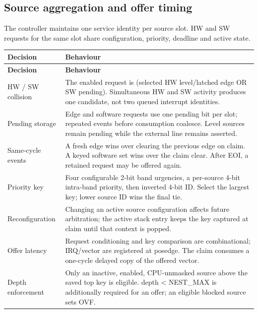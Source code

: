 \documentclass[11pt]{article}
\begin{document}
\subsection{Source aggregation and offer timing}
\noindent The controller maintains one service identity per source slot. HW and SW requests for the same slot share configuration, priority, deadline and active state.\par\medskip
{\small
\begin{longtable}{@{}L{0.2500\dimexpr\linewidth-12pt\relax}L{0.7500\dimexpr\linewidth-12pt\relax}@{}}
\toprule
\textbf{Decision} & \textbf{Behaviour} \\ \midrule
\endfirsthead
\toprule
\textbf{Decision} & \textbf{Behaviour} \\ \midrule
\endhead
HW / SW collision & The enabled request is (selected HW level/latched edge OR SW pending). Simultaneous HW and SW activity produces one candidate, not two queued interrupt identities. \\ \addlinespace[3pt]
Pending storage & Edge and software requests use one pending bit per slot; repeated events before consumption coalesce. Level sources remain pending while the external line remains asserted. \\ \addlinespace[3pt]
Same-cycle events & A fresh edge wins over clearing the previous edge on claim. A keyed software set wins over the claim clear. After EOI, a retained request may be offered again. \\ \addlinespace[3pt]
Priority key & Four configurable 2-bit band urgencies, a per-source 4-bit intra-band priority, then inverted 4-bit ID. Select the largest key; lower source ID wins the final tie. \\ \addlinespace[3pt]
Reconfiguration & Changing an active source configuration affects future arbitration; the active stack entry keeps the key captured at claim until that context is popped. \\ \addlinespace[3pt]
Offer latency & Request conditioning and key comparison are combinational; IRQ/vector are registered at posedge. The claim consumes a one-cycle delayed copy of the offered vector. \\ \addlinespace[3pt]
Depth enforcement & Only an inactive, enabled, CPU-unmasked source above the saved top key is eligible. depth < NEST\_MAX is additionally required for an offer; an eligible blocked source sets OVF. \\*
\bottomrule\end{longtable}}
\end{document}
